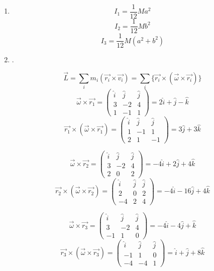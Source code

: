 \documentclass[a4paper,11pt,fleqn]{article}
\newcommand{\n}{\newline}
\begin{document}
\begin{enumerate}[start=12]
\item
	\[
		I_1 = \frac{1}{12} M a^2
	\]
	\[
		I_2 = \frac{1}{12} M b^2
	\]
	\[
		I_3 = \frac{1}{12} M (a^2 + b^2)
	\]
\n


\newpage
\item 
.\n

\[
	\vec{L} = \sum_i m_i ( \vec{r_i} \times \vec{v_i} ) = \sum_i \{ \vec{r_i} \times ( \vec{\omega} \times \vec{r_i} ) \}
\]
\[
	\vec{\omega} \times \vec{r_1} = \begin{pmatrix} \hat{i} & \hat{j} & \hat{j} \\ 3 & -2 & 4 \\ 1 & -1 & 1 \end{pmatrix} = 2 \hat{i} + \hat{j} - \hat{k}	
\]
\[
	\vec{r_1} \times ( \vec{\omega} \times \vec{r_1}) = \begin{pmatrix} \hat{i} & \hat{j} & \hat{j} \\ 1 & -1 & 1 \\ 2 & 1 & -1 \end{pmatrix} = 3 \hat{j} + 3 \hat{k}
\]

\[
\vec{\omega} \times \vec{r_2} = \begin{pmatrix} \hat{i} & \hat{j} & \hat{j} \\ 3 & -2 & 4 \\ 2 & 0 & 2 \end{pmatrix} = -4 \hat{i} + 2\hat{j} +4 \hat{k}	
\]
\[
\vec{r_2} \times ( \vec{\omega} \times \vec{r_2}) = \begin{pmatrix} \hat{i} & \hat{j} & \hat{j} \\ 2 & 0 & 2 \\ -4 & 2 & 4 \end{pmatrix} = -4 \hat{i} -16 \hat{j} + 4 \hat{k}
\]

\[
\vec{\omega} \times \vec{r_3} = \begin{pmatrix} \hat{i} & \hat{j} & \hat{j} \\ 3 & -2 & 4 \\ -1 & 1 & 0 \end{pmatrix} = -4 \hat{i} -4 \hat{j} + \hat{k}	
\]
\[
\vec{r_3} \times ( \vec{\omega} \times \vec{r_3}) = \begin{pmatrix} \hat{i} & \hat{j} & \hat{j} \\ -1 & 1 & 0 \\ -4 & -4 & 1 \end{pmatrix} = \hat{i} + \hat{j} + 8 \hat{k}
\]


\end{enumerate}
\end{document}
